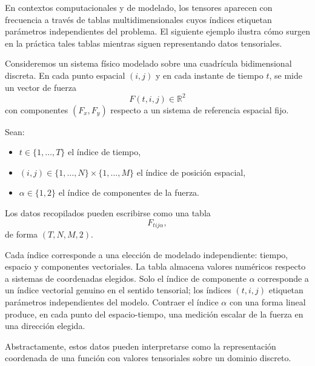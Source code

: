 
\medskip

En contextos computacionales y de modelado, los tensores aparecen con frecuencia
a través de tablas multidimensionales cuyos índices etiquetan parámetros
independientes del problema.
El siguiente ejemplo ilustra cómo surgen en la práctica tales tablas mientras
siguen representando datos tensoriales.

\medskip

Consideremos un sistema físico modelado sobre una cuadrícula bidimensional
discreta.
En cada punto espacial $(i,j)$ y en cada instante de tiempo $t$, se mide un
vector de fuerza
\[
F(t,i,j) \in \mathbb{R}^2
\]
con componentes $(F_x, F_y)$ respecto a un sistema de referencia espacial fijo.

\medskip

Sean:
\begin{itemize}
\item $t \in \{1,\dots,T\}$ el índice de tiempo,
\item $(i,j) \in \{1,\dots,N\} \times \{1,\dots,M\}$ el índice de posición espacial,
\item $\alpha \in \{1,2\}$ el índice de componentes de la fuerza.
\end{itemize}

Los datos recopilados pueden escribirse como una tabla
\[
F_{t i j \alpha},
\]
de forma $(T,N,M,2)$.

\medskip

Cada índice corresponde a una elección de modelado independiente: tiempo,
espacio y componentes vectoriales.
La tabla almacena valores numéricos respecto a sistemas de coordenadas elegidos.
Solo el índice de componente $\alpha$ corresponde a un índice vectorial genuino
en el sentido tensorial; los índices $(t,i,j)$ etiquetan parámetros
independientes del modelo.
Contraer el índice $\alpha$ con una forma lineal produce, en cada punto del
espacio-tiempo, una medición escalar de la fuerza en una dirección elegida.

\medskip

Abstractamente, estos datos pueden interpretarse como la representación
coordenada de una función con valores tensoriales sobre un dominio discreto.

